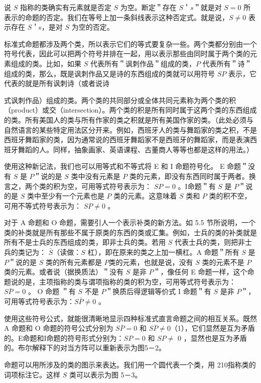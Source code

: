 说 $S$ 指称的类确实有元素就是否定 $S$ 为空。断定＂存在 $S$＇$s$＂就是对 $S=0$ 所表示的命题的否定。我们在等号上加一条斜线表示这种否定式。就是说，$S \neq 0$ 表示存在 $S$＇s，是对 $S$ 为空的否定。

标准式命题都涉及两个类，所以表示它们的等式要复杂一些。两个类都分别由一个符号代表，因此可以把两个符号并排在一起，用以表示那些由同时属于两个类的元素组成的类。比如，如果 $S$ 代表所有＂讽刺作品＂组成的类，$P$ 代表所有＂诗＂组成的类，那么，既是讽刺作品又是诗的东西组成的类就可以用符号 $S P$ 表示，它代表的就是所有讽刺诗（或者说诗

式讽刺作品）组成的类。两个类的共同部分或全体共同元素称为两个类的积（product）或交（intersection）。两个类的积是所有同时属于这两个类的东西组成的类。所有美国人的类与所有作家的类之积就是所有美国作家的类。（此处必须与自然语言的某些特定用法区分开来。例如，西班牙人的类与舞蹈家的类之积，不是西班牙舞蹈家的类，因为通常说的西班牙舞蹈家不是西班牙的舞蹈家，而是表演西班牙舞蹈的人。同样，抽象画家、英语课程、古董商人等等也都是这样的用法。）

使用这种新记法，我们也可以用等式和不等式将 E 和 I 命题符号化。 E 命题＂没有 $S$ 是 $P$＂说的是 $S$ 类中没有元素是 $P$ 类的元素，即没有东西同时属于两者。换言之，两个类的积为空，可用等式符号表示为： $S P=0$ 。I命题＂有 $S$ 是 $P$＂说的是 $S$ 类中至少有一个元素也是 $P$ 类的元素。这意味着 $S$ 类和 $P$ 类的积不空，可用不等式符号表示为： $S P \neq 0$ 。

对于 A 命题和 O 命题，需要引人一个表示补类的新方法。如 5.5 节所说明，一个类的补类就是所有那些不属于原类的东西的类或汇集。例如，士兵的类的补类就是所有不是士兵的东西组成的类，即非士兵的类。若用 $S$ 代表士兵的类，则把非士兵的类记为： $\bar{S}$（读做：$S$ 杠），即在原来的类之上加一横杠。A 命题＂所有 $S$ 是 $P$＂说的是 $S$ 类的所有元素都是 $P$类的元素，也就是说，没有 $S$ 类的元素不是 $P$ 类的元素。或者说（据换质法）＂没有 $S$ 是非 $P$＂，像任何 E 命题一样，这个命题说的是，主项指称的类与谓项指称的类的积为空，可用等式符号表示为：$S \bar{P}=0$ 。 O 命题 ＂有 $S$ 不是 $P$＂换质后得逻辑等价式 I 命题＂有 $S$ 是非 $P$＂，可用等式符号表示为：$S \bar{P} \neq 0$ 。

使用这些符号公式，就能很清晰地显示四种标准式直言命题之间的相互关系。既然 A 命题和 O 命题的符号公式分别为 $S \bar{P}=0$ 和 $S \bar{P} \neq 0$（1），它们显然是互为矛盾的。E命题和I命题的符号形式分别为：$S P=0$ 和 $S P \neq$ 0 ，显然也是互为矛盾的。布尔解释下的对当方阵可以重新表示为图5－2。

命题可以用所涉及的类的图示来表达。我们用一个圆代表一个类，用 210指称类的词项标注它。这样 $S$ 类可以表示为图 5－3。

